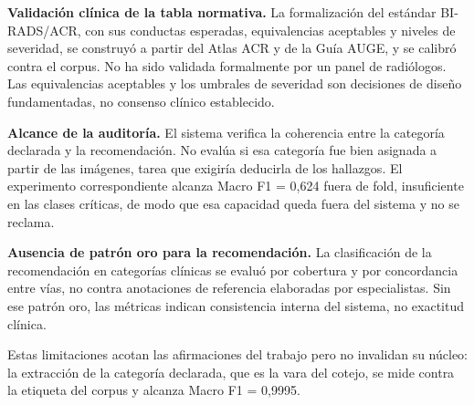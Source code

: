 \documentclass[10pt,journal,a4paper]{IEEEtran}
\begin{document}
\textbf{Validaci\'on cl\'inica de la tabla normativa.} La formalizaci\'on del est\'andar BI-RADS/ACR, con sus conductas esperadas, equivalencias aceptables y niveles de severidad, se construy\'o a partir del Atlas ACR y de la Gu\'ia AUGE, y se calibr\'o contra el corpus. No ha sido validada formalmente por un panel de radi\'ologos. Las equivalencias aceptables y los umbrales de severidad son decisiones de dise\~no fundamentadas, no consenso cl\'inico establecido.

\textbf{Alcance de la auditor\'ia.} El sistema verifica la coherencia entre la categor\'ia declarada y la recomendaci\'on. No eval\'ua si esa categor\'ia fue bien asignada a partir de las im\'agenes, tarea que exigir\'ia deducirla de los hallazgos. El experimento correspondiente alcanza Macro F1 = 0,624 fuera de fold, insuficiente en las clases cr\'iticas, de modo que esa capacidad queda fuera del sistema y no se reclama.

\textbf{Ausencia de patr\'on oro para la recomendaci\'on.} La clasificaci\'on de la recomendaci\'on en categor\'ias cl\'inicas se evalu\'o por cobertura y por concordancia entre v\'ias, no contra anotaciones de referencia elaboradas por especialistas. Sin ese patr\'on oro, las m\'etricas indican consistencia interna del sistema, no exactitud cl\'inica.

Estas limitaciones acotan las afirmaciones del trabajo pero no invalidan su n\'ucleo: la extracci\'on de la categor\'ia declarada, que es la vara del cotejo, se mide contra la etiqueta del corpus y alcanza Macro F1 = 0,9995.
\end{document}
